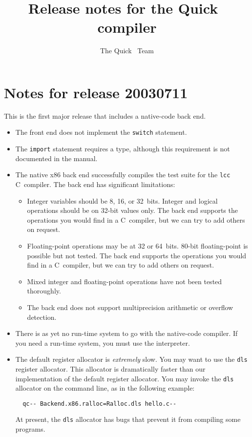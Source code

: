 \documentclass{article}
\title{Release notes for the Quick~{\PAL} compiler}
\author{The Quick~{\PAL} Team}
\begin{document}
\maketitle

\section{Notes for release 20030711}

This is the first major release that includes a native-code back end.
\begin{itemize}
\item
The front end does not implement the \texttt{switch} statement.
\item
The \texttt{import} statement requires a type, although this
requirement is not documented in the manual.
\item
The native x86 back end successfully compiles the test suite
for the \texttt{lcc} C~compiler.
The back end has significant limitations:
\begin{itemize}
\item
Integer variables should be 8, 16, or 32~bits.
Integer and logical operations should be on 32-bit values only.
The back end supports the operations you would find in a C~compiler,
but we can try to add others on request.
\item
Floating-point operations may be at 32 or 64~bits.
80-bit floating-point is possible but not tested.
The back end supports the operations you would find in a C~compiler,
but we can try to add others on request.
\item 
Mixed integer and floating-point operations have not been tested
thoroughly. 
\item
The back end does not support multiprecision arithmetic or overflow
detection. 
\end{itemize}
\item
There is as yet no run-time system to go with the native-code
compiler.
If you need a run-time system, you must use the interpreter.
\item
The default register allocator is \emph{extremely} slow.
You may want to use the \texttt{dls} register allocator. This
allocator is dramatically faster than our implementation of the
default register allocator. You may invoke the \texttt{dls} allocator on the
command line, as in the following example:
\begin{verbatim} 
  qc-- Backend.x86.ralloc=Ralloc.dls hello.c--
\end{verbatim}
At present, the \texttt{dls} allocator has bugs that prevent it from
compiling some programs.
\end{itemize}
\end{document}
